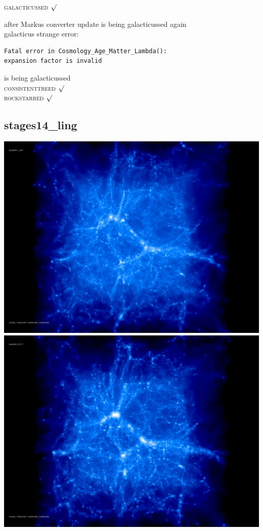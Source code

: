 \textsc{galacticussed} $\surd$

after Markus converter update 
is being galacticussed again \\
galacticus strange error: 
\begin{verbatim}
Fatal error in Cosmology_Age_Matter_Lambda():
expansion factor is invalid
\end{verbatim}
is being galacticussed \\
\textsc{consistenttreed} $\surd$ \\ 
\textsc{rockstarred} $\surd$

% 
%
%
%
%
%
%
%


\newpage
\subsection{stages14\_ling}

\includegraphics[scale=0.1]{stages14_ling/50.jpg} 
\includegraphics[scale=0.1]{stages14_ling/100.jpg}  \\

